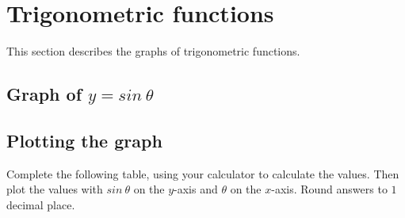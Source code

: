 \section{Trigonometric functions}
\nopagebreak
This section describes the graphs of trigonometric functions.\par 

\subsection{Graph of $y=sin~\theta $}
\subsection*{Plotting the graph}
\nopagebreak
Complete the following table, using your calculator to calculate the values. Then plot the values with $sin~\theta $ on the $y$-axis and $\theta $ on the $x$-axis. Round answers to $1$ decimal place.\par 

